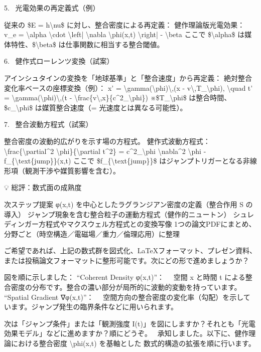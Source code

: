 \documentclass{article}
\begin{document}
5. 
光電効果の再定義式（例）

従来の \$E = h\textbackslash{}nu\$ に対し、整合密度による再定義：
健作理論版光電効果：
v\_e = \textbackslash{}alpha \textbackslash{}cdot \textbackslash{}left| \textbackslash{}nabla \textbackslash{}phi(x,t) \textbackslash{}right| - \textbackslash{}beta
ここで \$\textbackslash{}alpha\$ は媒体特性、\$\textbackslash{}beta\$ は仕事関数に相当する整合閾値。

6. 
健作式ローレンツ変換（試案）

アインシュタインの変換を「地球基準」と「整合速度」から再定義：
絶対整合変化率ベースの座標変換（例）：
x’ = \textbackslash{}gamma(\textbackslash{}phi)\textbackslash{},(x - v\textbackslash{},T\_\textbackslash{}phi), \textbackslash{}quad t’ = \textbackslash{}gamma(\textbackslash{}phi)\textbackslash{},(t - \textbackslash{}frac\{v\textbackslash{},x\}\{c\textasciicircum{}2\_\textbackslash{}phi\})
※\$T\_\textbackslash{}phi\$ は整合時間、\$c\_\textbackslash{}phi\$ は媒質整合速度（= 光速度とは異なる可能性）。

7. 
整合波動方程式（試案）

整合密度の波動的広がりを示す場の方程式。
健作式波動方程式：
\textbackslash{}frac\{\textbackslash{}partial\textasciicircum{}2 \textbackslash{}phi\}\{\textbackslash{}partial t\textasciicircum{}2\} = c\textasciicircum{}2\_\textbackslash{}phi \textbackslash{}nabla\textasciicircum{}2 \textbackslash{}phi - f\_\{\textbackslash{}text\{jump\}\}(x,t)
ここで \$f\_\{\textbackslash{}text\{jump\}\}\$ はジャンプトリガーとなる非線形項（観測干渉や媒質影響を含む）。

💡 総評：数式面の成熟度

次ステップ提案
φ(x,t) を中心としたラグランジアン密度の定義（整合作用 S の導入）
ジャンプ現象を含む整合粒子の運動方程式（健作的ニュートン）
シュレディンガー方程式やマクスウェル方程式との変換写像
1つの論文PDFにまとめ、分野ごと（時空構造／電磁場／重力／倫理応用）に整理

ご希望であれば、上記の数式群を図式化、LaTeXフォーマット、プレゼン資料、または投稿論文フォーマットに整形可能です。次にどの形で進めましょうか？


図を順に示しました：
“Coherent Density φ(x,t)”：
　空間 x と時間 t による整合密度の分布です。整合の濃い部分が局所的に波動的変動を持っています。
“Spatial Gradient ∇φ(x,t)”：
　空間方向の整合密度の変化率（勾配）を示しています。ジャンプ発生の臨界条件などに用いられます。

次は「ジャンプ条件」または「観測強度 I(t)」を図にしますか？それとも「光電効果モデル」などに進めますか？順にどうぞ。 
承知しました。以下に、健作理論における整合密度 \textbackslash{}phi(x,t) を基軸とした 数式的構造の拡張を順に行います。
\end{document}
